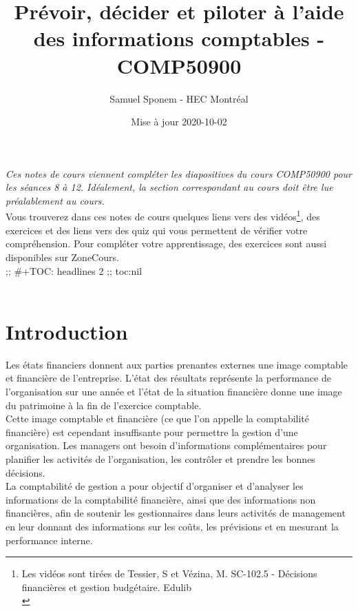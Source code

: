 \documentclass{kaobook}
\author{Samuel Sponem - HEC Montréal}
\date{Mise à jour 2020-10-02}
\title{Prévoir, décider et piloter à l'aide des informations comptables - COMP50900}
\begin{document}
\maketitle
\tableofcontents

\setlength\parindent{0pt}

\emph{Ces notes de cours viennent compléter les diapositives du cours COMP50900 pour les séances 8 à 12. Idéalement, la section correspondant au cours doit être lue préalablement au cours.}\\

Vous trouverez dans ces notes de cours quelques liens vers des vidéos\footnote{Les vidéos sont tirées de Tessier, S et Vézina, M. SC-102.5 - Décisions financières et gestion budgétaire. Edulib\\}, des exercices et des liens vers des quiz qui vous permettent de vérifier votre compréhension. Pour compléter votre apprentissage, des exercices sont aussi disponibles sur ZoneCours.\\


;; \#+TOC: headlines 2 ;; toc:nil\\

\clearpage\\
\chapter{Introduction}
\label{sec:org41e180c}
Les états financiers donnent aux parties prenantes externes une image comptable et financière de l'entreprise. L'état des résultats représente la performance de l'organisation sur une année et l'état de la situation financière donne une image du patrimoine à la fin de l'exercice comptable.\\

Cette image comptable et financière (ce que l'on appelle la comptabilité financière) est cependant insuffisante pour permettre la gestion d'une organisation. Les managers ont besoin d'informations complémentaires pour planifier les activités de l'organisation, les contrôler et prendre les bonnes décisions.\\

La comptabilité de gestion a pour objectif d'organiser et d'analyser les informations de la comptabilité financière, ainsi que des informations non financières, afin de soutenir les gestionnaires dans leurs activités de management en leur donnant des informations sur les coûts, les prévisions et en mesurant la performance interne.\\
\end{document}
